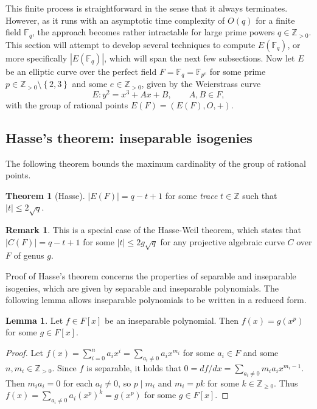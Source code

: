 \documentclass{article}
\newcommand{\F}{\mathbb{F}}
\newcommand{\Z}{\mathbb{Z}}
\newcommand{\rb}[1]{\left( #1 \right)}
\renewcommand{\sb}[1]{\left[ #1 \right]}
\newcommand{\cb}[1]{\left\{ #1 \right\}}
\newcommand{\abs}[1]{\left\lvert #1 \right\rvert}
\theoremstyle{definition}\newtheorem*{definition}{Definition}
\theoremstyle{definition}\newtheorem*{example}{Example}
\theoremstyle{definition}\newtheorem*{remark}{Remark}
\newtheorem{lemma}[proposition]{Lemma}
\newtheorem{theorem}[proposition]{Theorem}
\begin{document}
This finite process is straightforward in the sense that it always terminates. However, as it runs with an asymptotic time complexity of $ O\rb{q} $ for a finite field $ \F_q $, the approach becomes rather intractable for large prime powers $ q \in \Z_{> 0} $. This section will attempt to develop several techniques to compute $ E\rb{\F_q} $, or more specifically $ \abs{E\rb{\F_q}} $, which will span the next few subsections. Now let $ E $ be an elliptic curve over the perfect field $ F = \F_q = \F_{p^e} $ for some prime $ p \in \Z_{> 0} \setminus \cb{2, 3} $ and some $ e \in \Z_{> 0} $, given by the Weierstrass curve
$$ E : y^2 = x^3 + Ax + B, \qquad A, B \in F, $$
with the group of rational points $ E\rb{F} = \rb{E\rb{F}, O, +} $. 

\subsection{Hasse's theorem: inseparable isogenies}

The following theorem bounds the maximum cardinality of the group of rational points.

\begin{theorem}[Hasse]
\label{thm:hasse}
$ \abs{E\rb{F}} = q - t + 1 $ for some \emph{trace} $ t \in \Z $ such that $ \abs{t} \le 2\sqrt{q} $.
\end{theorem}

\begin{remark}
This is a special case of the Hasse-Weil theorem, which states that $ \abs{C\rb{F}} = q - t + 1 $ for some $ \abs{t} \le 2g\sqrt{q} $ for any projective algebraic curve $ C $ over $ F $ of genus $ g $.
\end{remark}

Proof of Hasse's theorem concerns the properties of separable and inseparable isogenies, which are given by separable and inseparable polynomials. The following lemma allows inseparable polynomials to be written in a reduced form.

\begin{lemma}
Let $ f \in F\sb{x} $ be an inseparable polynomial. Then $ f\rb{x} = g\rb{x^p} $ for some $ g \in F\sb{x} $.
\end{lemma}

\begin{proof}
Let $ f\rb{x} = \sum_{i = 0}^n a_ix^i = \sum_{a_i \ne 0} a_ix^{m_i} $ for some $ a_i \in F $ and some $ n, m_i \in \Z_{> 0} $. Since $ f $ is separable, it holds that $ 0 = df / dx = \sum_{a_i \ne 0} m_ia_ix^{m_i - 1} $. Then $ m_ia_i = 0 $ for each $ a_i \ne 0 $, so $ p \mid m_i $ and $ m_i = pk $ for some $ k \in \Z_{\ge 0} $. Thus $ f\rb{x} = \sum_{a_i \ne 0} a_i\rb{x^p}^k = g\rb{x^p} $ for some $ g \in F\sb{x} $.
\end{proof}
\end{document}
